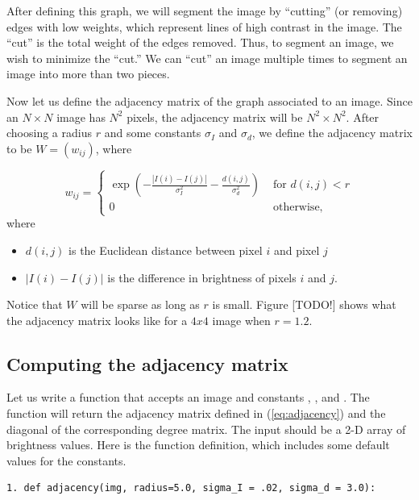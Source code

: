 After defining this graph, we will segment the image by ``cutting'' (or removing) edges with low weights, which represent lines of high contrast in the image. 
The ``cut'' is the total weight of the edges removed. Thus, to segment an image, we wish to minimize the ``cut.''
We can ``cut'' an image multiple times to segment an image into more than two pieces.

Now let us define the adjacency matrix of the graph associated to an image. 
Since an $N \times N$ image has $N^2$ pixels, the adjacency matrix will be $N^2 \times N^2$.
After choosing a radius $r$ and some constants $\sigma_I$ and $\sigma_d$, we define the adjacency matrix to be $W = (w_{ij})$, where

\begin{equation}
\label{eq:adjacency}
w_{ij} = \begin{cases} \exp(-\frac{|I(i) - I(j)|}{\sigma_I^2}-\frac{d(i,j)}{\sigma_d^2}) & \mbox{ for $d(i,j) < r$} \\ 0 & \mbox{ otherwise,} \end{cases}
\end{equation}
where
\begin{itemize}
	\item$d(i,j)$ is the Euclidean distance between pixel $i$ and pixel $j$
	\item $|I(i) - I(j)|$ is the difference in brightness of pixels $i$ and $j$.
\end{itemize}

Notice that $W$ will be sparse as long as $r$ is small. Figure [TODO!] shows what the adjacency matrix looks like for a $4x4$ image when $r=1.2$.


\subsection*{Computing the adjacency matrix}
Let us write a function that accepts an image  and constants , , and . The function will return the adjacency matrix defined in (\ref{eq:adjacency}) and the diagonal of the corresponding degree matrix. The input  should be a 2-D array of brightness values. Here is the function definition, which includes some default values for the constants.
\begin{lstlisting}
1. def adjacency(img, radius=5.0, sigma_I = .02, sigma_d = 3.0):
\end{lstlisting}


